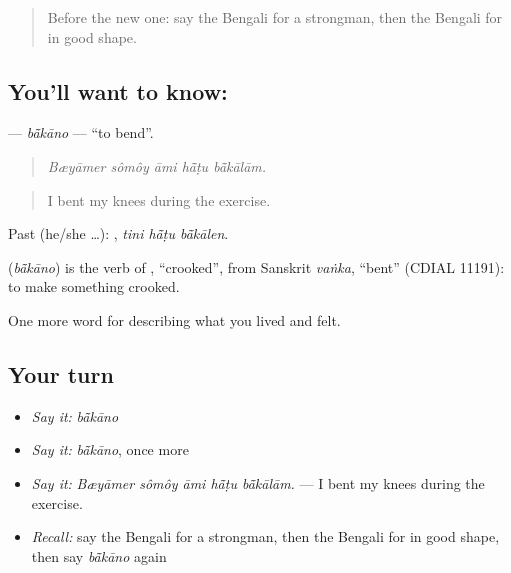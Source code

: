 \label{lesson:BN-C522-bakano}



\begin{quote}
Before the new one: say the Bengali for a strongman, then the Bengali for in good shape.
\end{quote}

\subsection*{You'll want to know: }
\textbf{} — \emph{bā̃kāno} — \textquotedblleft{}to bend\textquotedblright{}.

\begin{quote}
    
\end{quote}

\begin{quote}
\emph{Bæyāmer sômôy āmi hā̃ṭu bā̃kālām.}
\end{quote}

\begin{quote}
I bent my knees during the exercise.
\end{quote}

Past (he/she …):   , \emph{tini hā̃ṭu bā̃kālen}.

\begin{cousinweb}
\textbf{} (\emph{bā̃kāno}) is the verb of , \textquotedblleft{}crooked\textquotedblright{}, from Sanskrit \emph{vaṅka}, \textquotedblleft{}bent\textquotedblright{} (CDIAL 11191): to make something crooked.
\end{cousinweb}

\begin{grammarlens}[title={What you've built}]
One more word for describing what you lived and felt.
\end{grammarlens}

\subsection*{Your turn}
\begin{itemize}
\raggedright
  \item \emph{Say it:} \emph{bā̃kāno}
  \item \emph{Say it:} \emph{bā̃kāno}, once more
  \item \emph{Say it:} \emph{Bæyāmer sômôy āmi hā̃ṭu bā̃kālām.} — I bent my knees during the exercise.
  \item \emph{Recall:} say the Bengali for a strongman, then the Bengali for in good shape, then say \emph{bā̃kāno} again
\end{itemize}

